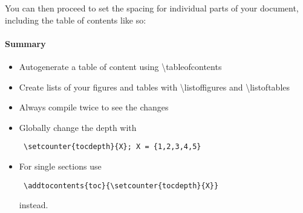     You can then proceed to set the spacing for individual parts of your document, including the table of contents like so:


    \paragraph{Summary}
    \begin{itemize} %
      \item Autogenerate a table of content using \textbackslash tableofcontents
      \item Create lists of your figures and tables with \textbackslash listoffigures and \textbackslash listoftables
      \item Always compile twice to see the changes
      \item Globally change the depth with \begin{verbatim} \setcounter{tocdepth}{X}; X = {1,2,3,4,5} \end{verbatim} 
      \item For single sections use \begin{verbatim} \addtocontents{toc}{\setcounter{tocdepth}{X}} \end{verbatim}  instead.
    \end{itemize} 
